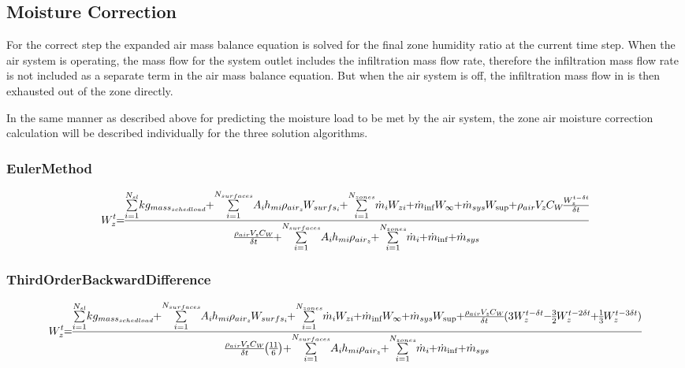 \subsection{Moisture Correction}\label{moisture-correction}

For the correct step the expanded air mass balance equation is solved for the final zone humidity ratio at the current time step. When the air system is operating, the mass flow for the system outlet includes the infiltration mass flow rate, therefore the infiltration mass flow rate is not included as a separate term in the air mass balance equation. But when the air system is off, the infiltration mass flow in is then exhausted out of the zone directly.

In the same manner as described above for predicting the moisture load to be met by the air system, the zone air moisture correction calculation will be described individually for the three solution algorithms.

\subsubsection{EulerMethod}\label{eulermethod-1-001}

\begin{equation}
\medmuskip=0mu
\thinmuskip=0mu
\thickmuskip=0mu
\nulldelimiterspace=0pt
\scriptspace=0pt
W_z^t = \frac{{\sum\limits_{i = 1}^{{N_{sl}}} {k{g_{mas{s_{sched\;load}}}}}  + \sum\limits_{i = 1}^{{N_{surfaces}}} {{A_i}{h_{mi}}} {\rho_{ai{r_z}}}{W_{surf{s_i}}} + \sum\limits_{i = 1}^{{N_{zones}}} {{{\dot m}_i}} {W_{zi}} + {{\dot m}_{\inf }}{W_\infty } + {{\dot m}_{sys}}{W_{\sup }} + {\rho_{air}}{V_z}{C_W}\frac{{W_z^{t - \delta t}}}{{\delta t}}}}{{\frac{{{\rho_{air}}{V_z}{C_W}}}{{\delta t}} + \sum\limits_{i = 1}^{{N_{surfaces}}} {{A_i}{h_{mi}}{\rho_{ai{r_z}}}}  + \sum\limits_{i = 1}^{{N_{zones}}} {{{\dot m}_i}}  + {{\dot m}_{\inf }} + {{\dot m}_{sys}}}}
\end{equation}

\subsubsection{ThirdOrderBackwardDifference}\label{thirdorderbackwarddifference-1-001}

\begin{equation}
\medmuskip=0mu
\thinmuskip=0mu
\thickmuskip=0mu
\nulldelimiterspace=0pt
\scriptspace=0pt
\scriptsize{W_z^t = \frac{{\sum\limits_{i = 1}^{{N_{sl}}} {k{g_{mas{s_{sched\;load}}}}}  + \sum\limits_{i = 1}^{{N_{surfaces}}} {{A_i}{h_{mi}}} {\rho_{ai{r_z}}}{W_{surf{s_i}}} + \sum\limits_{i = 1}^{{N_{zones}}} {{{\dot m}_i}} {W_{zi}} + {{\dot m}_{\inf }}{W_\infty } + {{\dot m}_{sys}}{W_{\sup }} + \frac{{{\rho_{air}}{V_z}{C_W}}}{{\delta t}}(3W_z^{t - \delta t} - \frac{3}{2}W_z^{t - 2\delta t} + \frac{1}{3}W_z^{t - 3\delta t})}}{{\frac{{{\rho_{air}}{V_z}{C_W}}}{{\delta t}}\left( {\frac{{11}}{6}} \right) + \sum\limits_{i = 1}^{{N_{surfaces}}} {{A_i}{h_{mi}}{\rho_{ai{r_z}}}}  + \sum\limits_{i = 1}^{{N_{zones}}} {{{\dot m}_i}}  + {{\dot m}_{\inf }} + {{\dot m}_{sys}}}}}
\end{equation}


